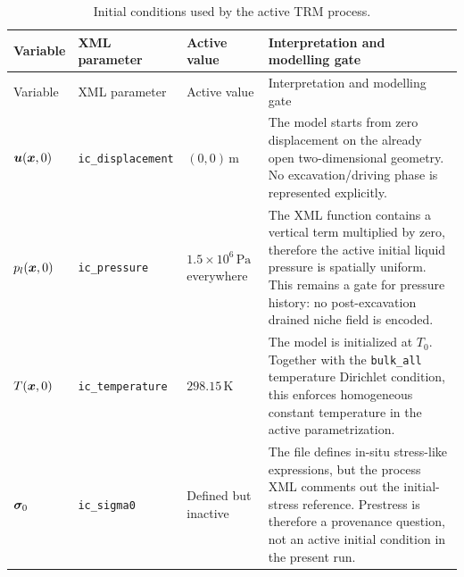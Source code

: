 \begingroup
\small
\setlength{\tabcolsep}{3pt}
\begin{longtable}{@{}L{0.13\textwidth} L{0.19\textwidth} L{0.20\textwidth} L{0.38\textwidth}@{}}
\caption{Initial conditions used by the active TRM process.}
\label{tab:initial-conditions}\\
\toprule
Variable & XML parameter & Active value & Interpretation and modelling gate\\
\midrule
\endfirsthead
\toprule
Variable & XML parameter & Active value & Interpretation and modelling gate\\
\midrule
\endhead
\bottomrule
\endlastfoot
\(\bm{u}(\bm{x},0)\) & \texttt{ic\_displacement} & \((0,0)\,\mathrm{m}\) &
The model starts from zero displacement on the already open two-dimensional geometry.
No excavation/driving phase is represented explicitly.\\
\(p_l(\bm{x},0)\) & \texttt{ic\_pressure} &
\(1.5\times 10^{6}\,\mathrm{Pa}\) everywhere &
The XML function contains a vertical term multiplied by zero, therefore the active
initial liquid pressure is spatially uniform.  This remains a gate for pressure
history: no post-excavation drained niche field is encoded.\\
\(T(\bm{x},0)\) & \texttt{ic\_temperature} &
\(298.15\,\mathrm{K}\) &
The model is initialized at \(T_0\).  Together with the \texttt{bulk\_all}
temperature Dirichlet condition, this enforces homogeneous constant temperature in
the active parametrization.\\
\(\bm{\sigma}_0\) & \texttt{ic\_sigma0} &
Defined but inactive &
The file defines in-situ stress-like expressions, but the process XML comments out
the initial-stress reference.  Prestress is therefore a provenance question, not an
active initial condition in the present run.\\
\end{longtable}
\endgroup
